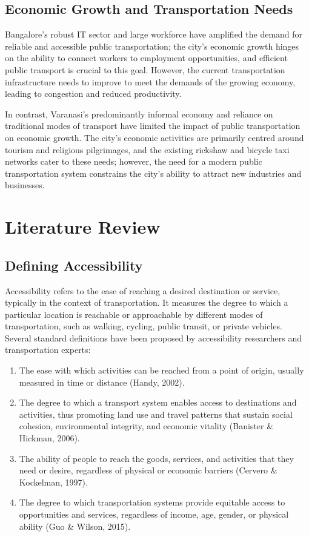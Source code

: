 \documentclass[11pt]{article}
\begin{document}
\subsection{Economic Growth and Transportation Needs}

Bangalore's robust IT sector and large workforce have amplified the demand for reliable and
accessible public transportation; the city's economic growth hinges on the ability to connect
workers to employment opportunities, and efficient public transport is crucial to this goal.
However, the current transportation infrastructure needs to improve to meet the demands of the
growing economy, leading to congestion and reduced productivity.

In contrast, Varanasi's predominantly informal economy and reliance on traditional modes of
transport have limited the impact of public transportation on economic growth. The city's
economic activities are primarily centred around tourism and religious pilgrimages, and the
existing rickshaw and bicycle taxi networks cater to these needs; however, the need for a modern
public transportation system constrains the city's ability to attract new industries and
businesses.

\section{Literature Review}

\subsection{Defining Accessibility}

Accessibility refers to the ease of reaching a desired destination or service, typically in the
context of transportation. It measures the degree to which a particular location is reachable or
approachable by different modes of transportation, such as walking, cycling, public transit, or
private vehicles. Several standard definitions have been proposed by accessibility researchers
and transportation experts:

\begin{enumerate}
  \item The ease with which activities can be reached from a point of origin, usually measured
  in time or distance (Handy, 2002).
  \item The degree to which a transport system enables access to destinations and activities,
  thus promoting land use and travel patterns that sustain social cohesion, environmental
  integrity, and economic vitality (Banister \& Hickman, 2006).
  \item The ability of people to reach the goods, services, and activities that they need or
  desire, regardless of physical or economic barriers (Cervero \& Kockelman, 1997).
  \item The degree to which transportation systems provide equitable access to opportunities and
  services, regardless of income, age, gender, or physical ability (Guo \& Wilson, 2015).
\end{enumerate}
\end{document}
